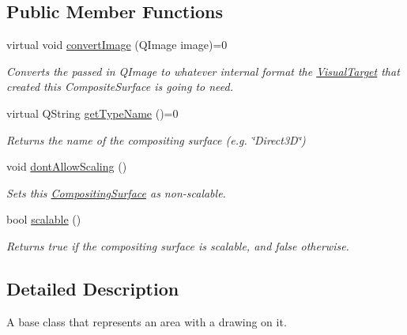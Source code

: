\subsection*{Public Member Functions}
\begin{DoxyCompactItemize}
\item 
\hypertarget{struct_picto_1_1_compositing_surface_ae19679a1e4ba977ce0e353ed841fc77e}{virtual void \hyperlink{struct_picto_1_1_compositing_surface_ae19679a1e4ba977ce0e353ed841fc77e}{convert\-Image} (Q\-Image image)=0}\label{struct_picto_1_1_compositing_surface_ae19679a1e4ba977ce0e353ed841fc77e}

\begin{DoxyCompactList}\small\item\em Converts the passed in Q\-Image to whatever internal format the \hyperlink{class_picto_1_1_visual_target}{Visual\-Target} that created this Composite\-Surface is going to need. \end{DoxyCompactList}\item 
\hypertarget{struct_picto_1_1_compositing_surface_a16eb6f27aa313a4a4a69becd7cd2c8be}{virtual Q\-String \hyperlink{struct_picto_1_1_compositing_surface_a16eb6f27aa313a4a4a69becd7cd2c8be}{get\-Type\-Name} ()=0}\label{struct_picto_1_1_compositing_surface_a16eb6f27aa313a4a4a69becd7cd2c8be}

\begin{DoxyCompactList}\small\item\em Returns the name of the compositing surface (e.\-g. \char`\"{}\-Direct3\-D\char`\"{}) \end{DoxyCompactList}\item 
void \hyperlink{struct_picto_1_1_compositing_surface_aa6b6ebf233b8be0d93c7825db895e27f}{dont\-Allow\-Scaling} ()
\begin{DoxyCompactList}\small\item\em Sets this \hyperlink{struct_picto_1_1_compositing_surface}{Compositing\-Surface} as non-\/scalable. \end{DoxyCompactList}\item 
bool \hyperlink{struct_picto_1_1_compositing_surface_a5f83658c486a563a563578965b2f0d22}{scalable} ()
\begin{DoxyCompactList}\small\item\em Returns true if the compositing surface is scalable, and false otherwise. \end{DoxyCompactList}\end{DoxyCompactItemize}


\subsection{Detailed Description}
A base class that represents an area with a drawing on it. 

